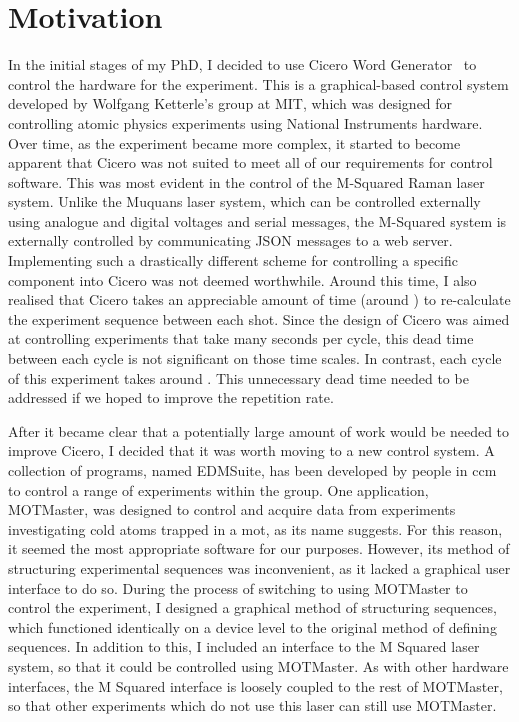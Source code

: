 \section{Motivation}
In the initial stages of my PhD, I decided to use Cicero Word Generator~\cite{Keshet2012} to control the hardware for the experiment. This is a graphical-based control system developed by Wolfgang Ketterle's group at MIT, which was designed for controlling atomic physics experiments using National Instruments hardware. Over time, as the experiment became more complex, it started to become apparent that Cicero was not suited to meet all of our requirements for control software. This was most evident in the control of the M-Squared Raman laser system. Unlike the Muquans laser system, which can be controlled externally using analogue and digital voltages and serial messages, the M-Squared system is externally controlled by communicating JSON messages to a web server. Implementing such a drastically different scheme for controlling a specific component into Cicero was not deemed worthwhile. Around this time, I also realised that Cicero takes an appreciable amount of time (around ) to re-calculate the experiment sequence between each shot. Since the design of Cicero was aimed at controlling experiments that take many seconds per cycle, this dead time between each cycle is not significant on those time scales. In contrast, each cycle of this experiment takes around . This unnecessary dead time needed to be addressed if we hoped to improve the repetition rate. \par\noindent
After it became clear that a potentially large amount of work would be needed to improve Cicero, I decided that it was worth moving to a new control system. A collection of programs, named EDMSuite, has been developed by people in \ac{ccm} to control a range of experiments within the group. One application, MOTMaster, was designed to control and acquire data from experiments investigating cold atoms trapped in a \ac{mot}, as its name suggests. For this reason, it seemed the most appropriate software for our purposes. However, its method of structuring experimental sequences was inconvenient, as it lacked a graphical user interface to do so. During the process of switching to using MOTMaster to control the experiment, I designed a graphical method of structuring sequences, which functioned identically on a device level to the original method of defining sequences. In addition to this, I included an interface to the M Squared laser system, so that it could be controlled using MOTMaster. As with other hardware interfaces, the M Squared interface is loosely coupled to the rest of MOTMaster, so that other experiments which do not use this laser can still use MOTMaster.

